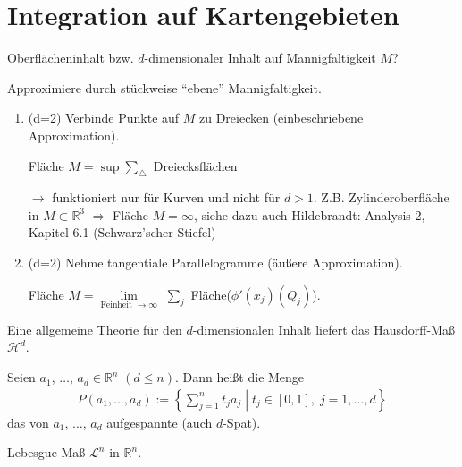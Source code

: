 \section{Integration auf Kartengebieten}

\begin{underlinedenvironment}[Frage]
	Oberflächeninhalt bzw. $d$-dimensionaler Inhalt auf Mannigfaltigkeit $M$?
\end{underlinedenvironment}

\begin{underlinedenvironment}[Idee]
	Approximiere durch stückweise "`ebene"' Mannigfaltigkeit.
	
	\begin{enumerate}[label={\alph*)}]
		\item (d=2) Verbinde Punkte auf $M$ zu Dreiecken (einbeschriebene Approximation).
		
		Fläche $M = \sup \sum_{\triangle}$ Dreiecksflächen
		
		$\rightarrow$ funktioniert nur für Kurven und nicht für $d > 1$. Z.B. Zylinderoberfläche in $M\subset\mathbb{R}^3$ $\Rightarrow$ Fläche $M = \infty$, siehe dazu auch Hildebrandt: Analysis 2, Kapitel 6.1 (Schwarz'scher Stiefel)
		
		\item (d=2) Nehme tangentiale Parallelogramme (äußere Approximation).
		
		Fläche $M = \lim\limits_\text{Feinheit $\rightarrow\infty$}$ $\sum_j$ Fläche($\phi'(x_j)(Q_j)$).
	\end{enumerate}
\end{underlinedenvironment}

\begin{underlinedenvironment}[Hinweis]
	Eine allgemeine Theorie für den $d$-dimensionalen Inhalt liefert das Hausdorff-Maß $\mathcal{H}^d$.
\end{underlinedenvironment}

\begin{*definition}
	Seien $a_1$, $\dotsc$, $a_d\in\mathbb{R}^n$ $(d\le n)$. Dann heißt die Menge \begin{align*}
		P(a_1,\dotsc,a_d) := \left\lbrace \left. \sum_{j=1}^{n}t_j a_j \;\right|\; t_j\in [0,1],\;j = 1,\dotsc, d\right\rbrace
	\end{align*}
	das von $a_1$, $\dotsc$, $a_d$ aufgespannte  (auch $d$-Spat).
\end{*definition}

\begin{plainenvironment}[Wiederhole]
	Lebesgue-Maß $\mathcal{L}^n$ in $\mathbb{R}^n$.
\end{plainenvironment}

